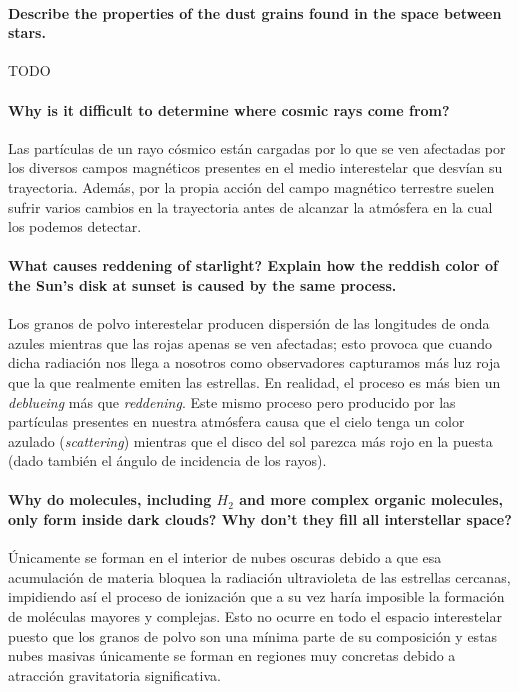 \documentclass{tufte-handout}
\begin{document}
\paragraph{\textbf{Describe the properties of the dust grains found in the space between stars.}}

TODO

\paragraph{\textbf{Why is it difficult to determine where cosmic rays come from?}}

Las partículas de un rayo cósmico están cargadas por lo que se ven afectadas por los diversos campos magnéticos presentes en el medio interestelar que desvían su trayectoria. Además, por la propia acción del campo magnético terrestre suelen sufrir varios cambios en la trayectoria antes de alcanzar la atmósfera en la cual los podemos detectar.

\paragraph{\textbf{What causes reddening of starlight? Explain how the reddish color of the Sun’s disk at sunset is caused by
the same process.}}

Los granos de polvo interestelar producen dispersión de las longitudes de onda azules mientras que las rojas apenas se ven afectadas; esto provoca que cuando dicha radiación nos llega a nosotros como observadores capturamos más luz roja que la que realmente emiten las estrellas. En realidad, el proceso es más bien un \emph{deblueing} más que \emph{reddening}. Este mismo proceso pero producido por las partículas presentes en nuestra atmósfera causa que el cielo tenga un color azulado (\emph{scattering}) mientras que el disco del sol parezca más rojo en la puesta (dado también el ángulo de incidencia de los rayos).

\paragraph{\textbf{Why do molecules, including $H_2$ and more complex organic molecules, only form inside dark clouds? Why
don’t they fill all interstellar space?}}

Únicamente se forman en el interior de nubes oscuras debido a que esa acumulación de materia bloquea la radiación ultravioleta de las estrellas cercanas, impidiendo así el proceso de ionización que a su vez haría imposible la formación de moléculas mayores y complejas. Esto no ocurre en todo el espacio interestelar puesto que los granos de polvo son una mínima parte de su composición y estas nubes masivas únicamente se forman en regiones muy concretas debido a atracción gravitatoria significativa.
\end{document}
